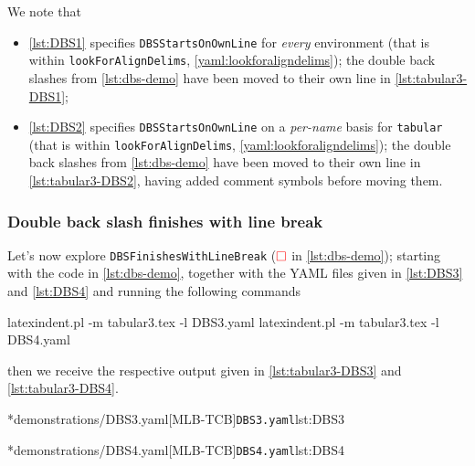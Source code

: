 	We note that
	\begin{itemize}
		\item \cref{lst:DBS1} specifies \texttt{DBSStartsOnOwnLine} for
		      \emph{every} environment (that is within \texttt{lookForAlignDelims},
		      \vref{yaml:lookforaligndelims});
		      the double back slashes from \cref{lst:dbs-demo} have been moved to their own
		      line in \cref{lst:tabular3-DBS1};
		\item \cref{lst:DBS2} specifies \texttt{DBSStartsOnOwnLine} on a
		      \emph{per-name} basis for \texttt{tabular} (that is within \texttt{lookForAlignDelims}, \vref{yaml:lookforaligndelims});
		      the double back slashes from \cref{lst:dbs-demo} have been moved to their own
		      line in \cref{lst:tabular3-DBS2}, having added comment symbols before moving them.
	\end{itemize}

\subsubsection{Double back slash finishes with line break}
	Let's now explore \texttt{DBSFinishesWithLineBreak} ($\color{red}\square$ in \cref{lst:dbs-demo}); starting with the code in
	\cref{lst:dbs-demo}, together with the YAML files given in
	\cref{lst:DBS3} and \cref{lst:DBS4} and running the following
	commands
	\begin{commandshell}
latexindent.pl -m tabular3.tex -l DBS3.yaml
latexindent.pl -m tabular3.tex -l DBS4.yaml
\end{commandshell}
	then we receive the respective output given in \cref{lst:tabular3-DBS3} and
	\cref{lst:tabular3-DBS4}.

	\begin{cmhtcbraster}[raster column skip=.01\linewidth]
		\cmhlistingsfromfile*[style=yaml-LST]*{demonstrations/DBS3.yaml}[MLB-TCB]{\texttt{DBS3.yaml}}{lst:DBS3}
	\end{cmhtcbraster}

	\begin{cmhtcbraster}[raster column skip=.01\linewidth]
		\cmhlistingsfromfile*[style=yaml-LST]*{demonstrations/DBS4.yaml}[MLB-TCB]{\texttt{DBS4.yaml}}{lst:DBS4}
	\end{cmhtcbraster}

